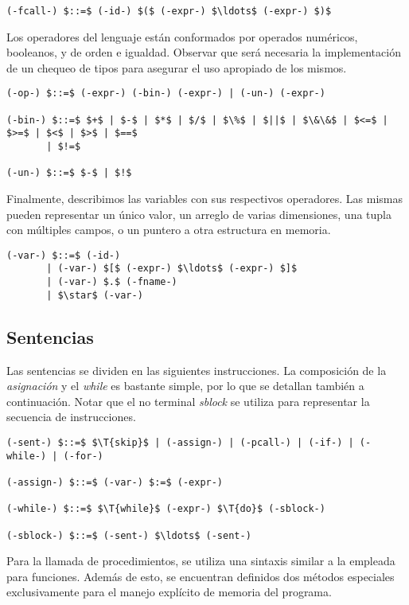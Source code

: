 \documentclass{article}
\begin{document}
\begin{lstlisting}[style = syntax]
(-fcall-) $::=$ (-id-) $($ (-expr-) $\ldots$ (-expr-) $)$
\end{lstlisting}

Los operadores del lenguaje están conformados por operados numéricos, booleanos, y de orden e igualdad.
Observar que será necesaria la implementación de un chequeo de tipos para asegurar el uso apropiado de los mismos.

\begin{lstlisting}[style = syntax]
(-op-) $::=$ (-expr-) (-bin-) (-expr-) | (-un-) (-expr-)

(-bin-) $::=$ $+$ | $-$ | $*$ | $/$ | $\%$ | $||$ | $\&\&$ | $<=$ | $>=$ | $<$ | $>$ | $==$
       | $!=$

(-un-) $::=$ $-$ | $!$
\end{lstlisting}

Finalmente, describimos las variables con sus respectivos operadores.
Las mismas pueden representar un único valor, un arreglo de varias dimensiones, una tupla con múltiples campos, o un puntero a otra estructura en memoria. 

\begin{lstlisting}[style = syntax]
(-var-) $::=$ (-id-)
       | (-var-) $[$ (-expr-) $\ldots$ (-expr-) $]$
       | (-var-) $.$ (-fname-)
       | $\star$ (-var-)
\end{lstlisting}

\subsection{Sentencias}

Las sentencias se dividen en las siguientes instrucciones.
La composición de la \textit{asignación} y el \textit{while} es bastante simple, por lo que se detallan también a continuación.
Notar que el no terminal \textit{sblock} se utiliza para representar la secuencia de instrucciones.

\begin{lstlisting}[style = syntax]
(-sent-) $::=$ $\T{skip}$ | (-assign-) | (-pcall-) | (-if-) | (-while-) | (-for-)

(-assign-) $::=$ (-var-) $:=$ (-expr-)

(-while-) $::=$ $\T{while}$ (-expr-) $\T{do}$ (-sblock-)

(-sblock-) $::=$ (-sent-) $\ldots$ (-sent-)
\end{lstlisting}

Para la llamada de procedimientos, se utiliza una sintaxis similar a la empleada para funciones.
Además de esto, se encuentran definidos dos métodos especiales exclusivamente para el manejo explícito de memoria del programa.
\end{document}
